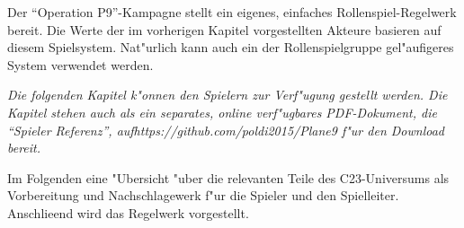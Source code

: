 
Der ``Operation P9''-Kampagne stellt ein eigenes, einfaches Rollenspiel-Regelwerk bereit. Die Werte der im vorherigen Kapitel vorgestellten Akteure basieren auf diesem Spielsystem. Nat"urlich kann auch ein der Rollenspielgruppe gel"aufigeres System verwendet werden.

\emph{Die folgenden Kapitel k"onnen den Spielern zur Verf"ugung gestellt werden. Die Kapitel stehen auch als ein separates, online verf"ugbares PDF-Dokument, die ``Spieler Referenz'', auf\newline{}\textit{https://github.com/poldi2015/Plane9} f"ur den Download bereit.}


Im Folgenden eine "Ubersicht "uber die relevanten Teile des C23-Universums als Vorbereitung und Nachschlagewerk f"ur die Spieler und den Spielleiter. Anschlie\3end wird das Regelwerk vorgestellt.





